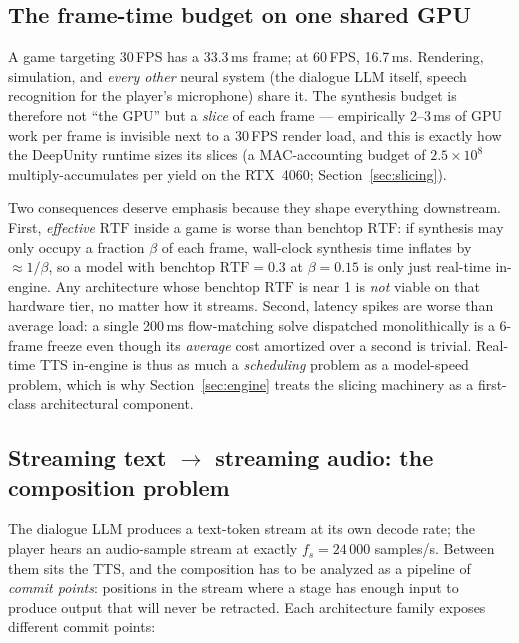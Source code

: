 \documentclass[11pt,a4paper]{article}
\newcommand{\RTF}{\ensuremath{\mathrm{RTF}}}
\newcommand{\fs}{\ensuremath{f_{s}}}                %
\begin{document}
\subsection{The frame-time budget on one shared GPU}
\label{sec:framebudget}

A game targeting 30\,FPS has a 33.3\,ms frame; at 60\,FPS, 16.7\,ms. Rendering,
simulation, and \emph{every other} neural system (the dialogue LLM itself, speech
recognition for the player's microphone) share it. The synthesis budget is therefore not
``the GPU'' but a \emph{slice} of each frame --- empirically 2--3\,ms of GPU work per
frame is invisible next to a 30\,FPS render load, and this is exactly how the DeepUnity
runtime sizes its slices (a MAC-accounting budget of $2.5\times 10^{8}$
multiply-accumulates per yield on the RTX~4060; Section~\ref{sec:slicing}).

Two consequences deserve emphasis because they shape everything downstream. First,
\emph{effective} \RTF{} inside a game is worse than benchtop \RTF{}: if synthesis may
only occupy a fraction $\beta$ of each frame, wall-clock synthesis time inflates by
$\approx 1/\beta$, so a model with benchtop $\RTF = 0.3$ at $\beta = 0.15$ is only just
real-time in-engine. Any architecture whose benchtop \RTF{} is near 1 is \emph{not}
viable on that hardware tier, no matter how it streams. Second, latency spikes are worse
than average load: a single 200\,ms flow-matching solve dispatched monolithically is a
6-frame freeze even though its \emph{average} cost amortized over a second is trivial.
Real-time TTS in-engine is thus as much a \emph{scheduling} problem as a model-speed
problem, which is why Section~\ref{sec:engine} treats the slicing machinery as a
first-class architectural component.

\subsection{Streaming text $\rightarrow$ streaming audio: the composition problem}
\label{sec:composition}

The dialogue LLM produces a text-token stream at its own decode rate; the player hears an
audio-sample stream at exactly $\fs = 24\,000$ samples/s. Between them sits the TTS,
and the composition has to be analyzed as a pipeline of \emph{commit points}: positions
in the stream where a stage has enough input to produce output that will never be
retracted. Each architecture family exposes different commit points:
\end{document}
